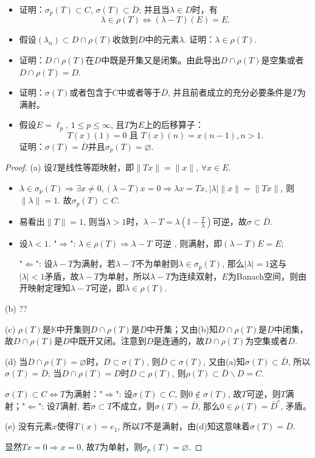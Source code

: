 \documentclass[a4paper,8pt]{ctexart}\textwidth 140mm \textheight 216mm
\newcommand{\8}{\infty}
\newcommand{\RA}{\Rightarrow}
\newcommand{\LA}{\Leftarrow}
\begin{document}
\begin{itemize}
	\item[(a)] 证明：$\sigma_p(T)\subset C$, $\sigma(T)\subset \overline{D}$; 并且当$\lambda\in D$时，有
	\[\lambda\in\rho(T)\Leftrightarrow(\lambda-T)(E)=E.\]
	\item[(b)] 假设$(\lambda_n)\subset D\cap \rho(T)$收敛到$D$中的元素$\lambda$. 证明：$\lambda\in\rho(T)$.
	\item[(c)] 证明：$D\cap \rho(T)$在$D$中既是开集又是闭集。由此导出$D\cap\rho(T)$是空集或者$D\cap\rho(T)=D$.
	\item[(d)] 证明：$\sigma(T)$或者包含于$C$中或者等于$\overline{D}$, 并且前者成立的充分必要条件是$T$为满射。
	\item[(e)] 假设$E=\ell_p$, $1\leq p\leq\infty$, 且$T$为$E$上的后移算子：
	\[T(x)(1)=0\text{ 且 }T(x)(n)=x(n-1),n>1.\]
	证明：$\sigma(T)=\overline{D}$并且$\sigma_p(T)=\varnothing$.
\end{itemize}
\begin{proof}
	(a) 设$T$是线性等距映射，即$\|Tx\|=\|x\|$, $\forall x\in E$.
	\begin{itemize}
		\item[(1)] $\lambda\in\sigma_p(T)\RA\exists x\ne 0, (\lambda-T)x=0\RA\lambda x=Tx, |\lambda|\|x\|=\|Tx\|$, 则$\|\lambda\|=1$. 故$\sigma_p(T)\subset C$.
		\item[(2)] 易看出$\|T\|=1$, 则当$\lambda>1$时，$\lambda-T=\lambda(\mathbb{I}-\frac{T}{\lambda})$可逆，故$\sigma\subset\overline{D}$.
		\item[(3)] 设$\lambda<1$. "$\RA$": $\lambda\in\rho(T)\RA\lambda-T\text{ 可逆 }$, 则满射，即$(\lambda-T)E=E$;
		
		"$\LA$": 设$\lambda-T$为满射，若$\lambda-T$不为单射则$\lambda\in\sigma_p(T)$, 那么$|\lambda|=1$这与$|\lambda|<1$矛盾，故$\lambda-T$为单射，所以$\lambda-T$为连续双射，$E$为Banach空间，则由开映射定理知$\lambda-T$可逆，即$\lambda\in\rho(T)$.
	\end{itemize}
	
	(b) ??
	
	(c) $\rho(T)$是$\mathbb{K}$中开集则$D\cap\rho(T)$是$D$中开集；又由(b)知$D\cap\rho(T)$是$D$中闭集，故$D\cap\rho(T)$是$D$中既开又闭。注意到$D$是连通的，故$D\cap\rho(T)$为空集或者$D$.
	
	(d) 当$D\cap \rho(T)=\varnothing$时，$D\subset\sigma(T)$, 则$\overline{D}\subset \sigma(T)$, 又由(a)知$\sigma(T)\subset \overline{D}$, 所以$\sigma(T)=\overline{D}$; 当$D\cap \rho(T)=D$时$D\subset \rho(T)$, 则$\rho(T)\subset \overline{D}\backslash D=C$.
	
	$\sigma(T)\subset C\Leftrightarrow T$为满射："$\RA$": 设$\sigma(T)\subset C$, 则$0\notin \sigma(T)$, 故$T$可逆，则$T$满射；"$\LA$": 设$T$满射, 若$\sigma\subset T$不成立，则$\sigma(T)=\overline{D}$, 那么$0\in\rho(T)=\overline{D}^c$, 矛盾。 
	
	(e) 没有元素$x$使得$T(x)=e_1$, 所以$T$不是满射，由(d)知这意味着$\sigma(T)=\overline{D}$.
	
	显然$Tx=0\RA x=0$, 故$T$为单射，则$\sigma_p(T)=\varnothing$. 
\end{proof}
\end{document}

